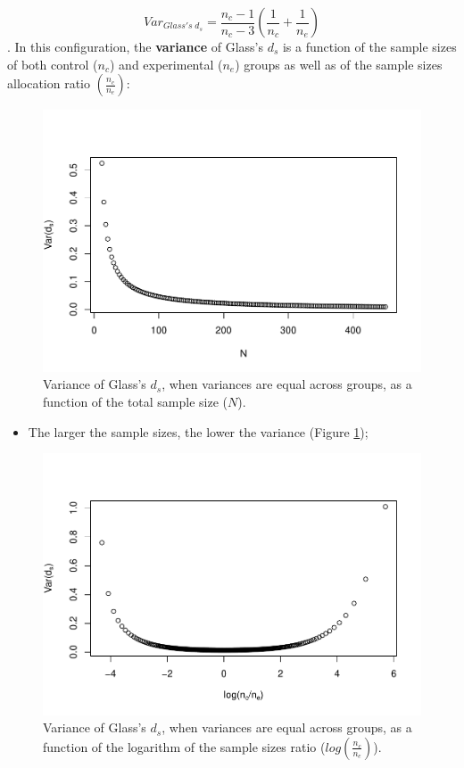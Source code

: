 \documentclass[
  english,
  man]{apa6}
\providecommand{\tightlist}{%
  \setlength{\itemsep}{0pt}\setlength{\parskip}{0pt}}
\begin{document}
\[Var_{Glass's \; d_s} = \frac{n_c-1}{n_c-3} \left( \frac{1}{n_c}+\frac{1}{n_e}\right)\]. In this configuration, the \textbf{variance} of Glass's \(d_s\) is a function of the sample sizes of both control (\(n_c\)) and experimental (\(n_e\)) groups as well as of the sample sizes allocation ratio \(\left( \frac{n_c}{n_e}\right)\):

\begin{figure}
\centering
\includegraphics{Theoretical-Variance-of-all-estimators-as-a-function-of-population-parameters_files/figure-latex/varglassNsize2-1.pdf}
\caption{\label{fig:varglassNsize2}Variance of Glass's \(d_s\), when variances are equal across groups, as a function of the total sample size (\(N\)).}
\end{figure}

\begin{itemize}
\tightlist
\item
  The larger the sample sizes, the lower the variance (Figure \ref{fig:varglassNsize2});
\end{itemize}

\begin{figure}
\centering
\includegraphics{Theoretical-Variance-of-all-estimators-as-a-function-of-population-parameters_files/figure-latex/varglasshomNratio2-1.pdf}
\caption{\label{fig:varglasshomNratio2}Variance of Glass's \(d_s\), when variances are equal across groups, as a function of the logarithm of the sample sizes ratio (\(log\left(\frac{n_c}{n_e} \right)\)).}
\end{figure}
\end{document}

